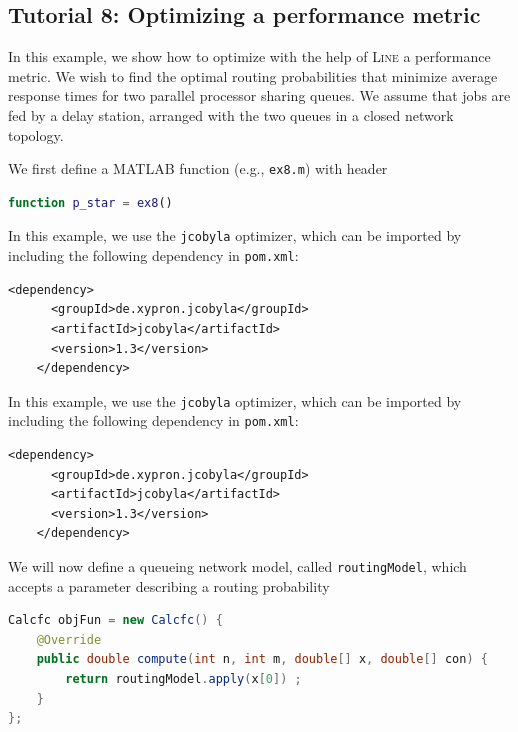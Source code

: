 \subsection{Tutorial 8: Optimizing a performance metric}
\label{example-8-optimizing-a-performance-metric}
In this example, we show how to optimize with the help of \textsc{Line} a performance metric. We wish to find the optimal routing probabilities that minimize average response times for two parallel processor sharing queues. We assume that jobs are fed by a delay station, arranged with the two queues in a closed network topology.

\begin{MATLAB}
We first define a MATLAB function (e.g., \texttt{ex8.m}) with header
\begin{lstlisting}[language = matlab]
function p_star = ex8()
\end{lstlisting}
\end{MATLAB}
\begin{JAVA}
In this example, we use the \texttt{jcobyla} optimizer, which can be imported by including the following dependency in \texttt{pom.xml}:
\begin{lstlisting}[basicstyle=\ttfamily\scriptsize]
    <dependency>
      <groupId>de.xypron.jcobyla</groupId>
      <artifactId>jcobyla</artifactId>
      <version>1.3</version>
    </dependency>
\end{lstlisting}
\end{JAVA}
\begin{KOTLIN}
In this example, we use the \texttt{jcobyla} optimizer, which can be imported by including the following dependency in \texttt{pom.xml}:
\begin{lstlisting}[basicstyle=\ttfamily\scriptsize]
    <dependency>
      <groupId>de.xypron.jcobyla</groupId>
      <artifactId>jcobyla</artifactId>
      <version>1.3</version>
    </dependency>
\end{lstlisting}
\end{KOTLIN}
\begin{JAVA}
We will now define a queueing network model, called \texttt{routingModel}, which accepts a parameter describing a routing probability
\begin{lstlisting}[language=java, basicstyle=\ttfamily\scriptsize]
Calcfc objFun = new Calcfc() {
    @Override
    public double compute(int n, int m, double[] x, double[] con) {
        return routingModel.apply(x[0]) ;
    }
};
\end{lstlisting}
\end{JAVA}
